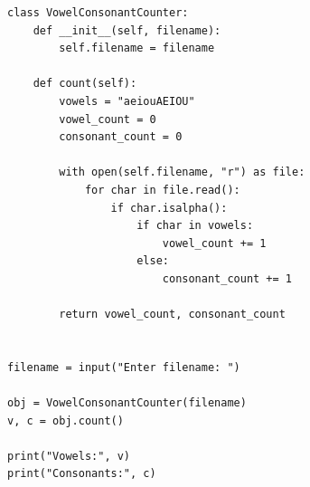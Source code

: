 \begin{verbatim}
class VowelConsonantCounter:
    def __init__(self, filename):
        self.filename = filename

    def count(self):
        vowels = "aeiouAEIOU"
        vowel_count = 0
        consonant_count = 0

        with open(self.filename, "r") as file:
            for char in file.read():
                if char.isalpha():
                    if char in vowels:
                        vowel_count += 1
                    else:
                        consonant_count += 1

        return vowel_count, consonant_count


filename = input("Enter filename: ")

obj = VowelConsonantCounter(filename)
v, c = obj.count()

print("Vowels:", v)
print("Consonants:", c)
\end{verbatim}